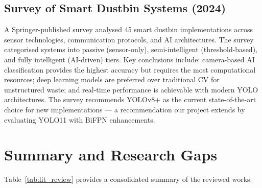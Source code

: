 \subsection{Survey of Smart Dustbin Systems (2024)}

A Springer-published survey \cite{springer_survey2024} analysed 45 smart dustbin implementations across sensor technologies, communication protocols, and AI architectures. The survey categorised systems into passive (sensor-only), semi-intelligent (threshold-based), and fully intelligent (AI-driven) tiers. Key conclusions include: camera-based AI classification provides the highest accuracy but requires the most computational resources; deep learning models are preferred over traditional CV for unstructured waste; and real-time performance is achievable with modern YOLO architectures. The survey recommends YOLOv8+ as the current state-of-the-art choice for new implementations — a recommendation our project extends by evaluating YOLO11 with BiFPN enhancements.

\section{Summary and Research Gaps}

Table~\ref{tab:lit_review} provides a consolidated summary of the reviewed works.

